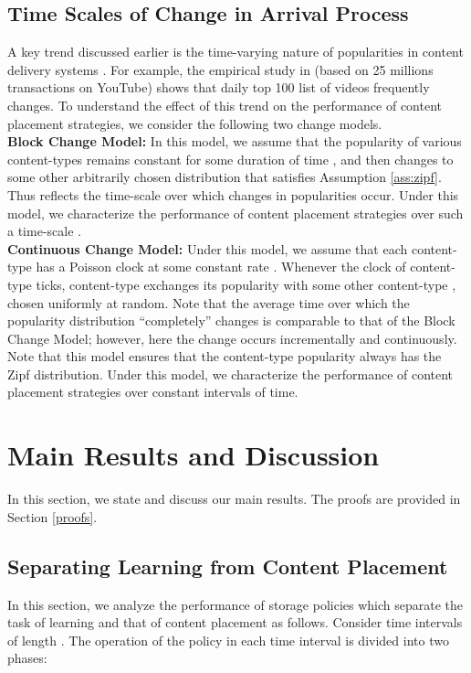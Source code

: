 \documentclass[10pt, conference, letterpaper]{IEEEtran}
\begin{document}
\subsection{Time Scales of Change in Arrival Process}
\label{subsec:change_model}
A key trend discussed earlier is the time-varying nature of
popularities in content delivery systems \cite{Gill07,temporal13}. For
example, the empirical study in \cite{Gill07} (based on 25 millions
transactions on YouTube) shows that daily top 100 list of videos
frequently changes.
To understand the effect of this trend on the performance of content
placement strategies, we consider the following two change models.\\

\noindent \textbf{Block Change Model:} In this model, we assume that
the popularity of various content-types remains constant for some
duration of time , and then changes to some other arbitrarily
chosen distribution that satisfies Assumption \ref{ass:zipf}. Thus
 reflects the time-scale over which changes in popularities
occur. Under this model, we characterize the performance of content
placement strategies over such a time-scale . \\

\noindent \textbf{Continuous Change Model:} Under this model, we
assume that each content-type has a Poisson clock at some constant
rate . Whenever the clock of content-type  ticks,
content-type  exchanges its popularity with some other content-type
, chosen uniformly at random. Note that the average time over which
the popularity distribution ``completely'' changes is comparable to
that of the Block Change Model; however, here the change occurs incrementally
and continuously. Note that this model ensures that the
content-type popularity always has the Zipf distribution.
Under this model, we characterize the performance of content placement
strategies over constant intervals of time.

\section{Main Results and Discussion}
\label{sec:main_results}

In this section, we state and discuss our main results. The
proofs are provided in Section \ref{proofs}.


\subsection{Separating Learning from Content Placement}
\label{subsec:LBSSP}
In this section, we analyze the performance of storage policies which
separate the task of learning and that of content placement as
follows. Consider time intervals of length . The operation of
the policy in each time interval is divided into two phases:\\
\end{document}
